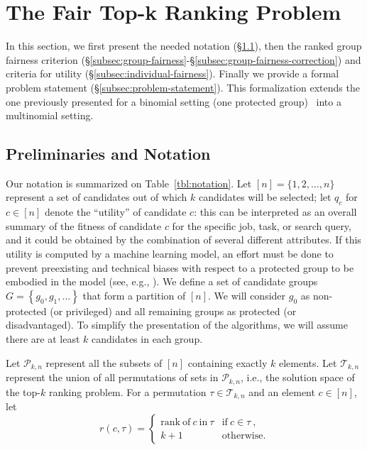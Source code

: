 
\section{The Fair Top-k Ranking Problem}\label{sec:problem}

In this section, we first present the needed notation (\S\ref{subsec:preliminaries}), then the ranked group fairness criterion (\S\ref{subsec:group-fairness}-\S\ref{subsec:group-fairness-correction}) and criteria for utility (\S\ref{subsec:individual-fairness}). Finally we provide a formal problem statement (\S\ref{subsec:problem-statement}).
%
This formalization extends the one previously presented for a binomial setting (one protected group)~\cite{zehlike2017fair} into a multinomial setting.

\subsection{Preliminaries and Notation}
\label{subsec:preliminaries}
Our notation is summarized on Table~\ref{tbl:notation}.
%
Let $[n] = \{ 1, 2, \dots, n \}$ represent a set of candidates out of which $k$ candidates will be selected; let $q_c$ for $c \in [n]$ denote the ``utility'' of candidate $c$: this can be interpreted as an overall summary of the fitness of candidate $c$ for the specific job, task, or search query, and it could be obtained by the combination of several different attributes.
%
If this utility is computed by a machine learning model, an effort must be done to prevent preexisting and technical biases with respect to a protected group to be embodied in the model (see, e.g., \cite{Sweeney2013}).
%
We define a set of candidate groups $G = \left\{ g_0, g_1, \ldots \right\}$ that form a partition of $[n]$. We will consider $g_0$ as non-protected (or privileged) and all remaining groups as protected (or disadvantaged).
%
To simplify the presentation of the algorithms, we will assume there are at least $k$ candidates in each group. %

Let ${\mathcal P}_{k,n}$ represent all the subsets of $[n]$ containing exactly $k$ elements.
%
Let ${\mathcal T}_{k,n}$ represent the union of all permutations of sets in ${\mathcal P}_{k,n}$, i.e., the solution space of the top-$k$ ranking problem.
%
For a permutation $\tau \in {\mathcal T}_{k,n}$ and an element $c \in [n]$, let
\[
r(c, \tau) = \begin{cases}
\mathrm{rank~of~} c \mathrm{~in~} \tau & \mathrm{if~} c \in \tau~, \\
k + 1 & \mathrm{otherwise}.
\end{cases}
\]


